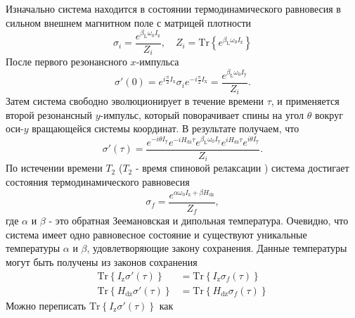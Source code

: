 \documentclass[utf8]{jetp}
\begin{document}
Изначально система находится в состоянии термодинамического равновесия в сильном внешнем магнитном поле с матрицей плотности
%
\begin{equation}
  \label{eq:a1}
  \sigma_{i} = \dfrac{e^{\beta_\mathrm{L} \omega_{0} I_\mathrm{z}}}{Z_{i}} ,
  \quad
  Z_{i} = \mathrm{Tr}\left\{e^{\beta_\mathrm{L} \omega_{0} I_\mathrm{z}} \right\}
\end{equation}
%
После первого резонансного $x$-импульса
%
\begin{equation}
  \label{eq:a2}
  \sigma'(0) = e^{ i \frac \pi 2 I_\mathrm{x}}
  \sigma_{i}
  e^{-i \frac \pi 2 I_\mathrm{x}}
  = \dfrac{e^{\beta_\mathrm{L} \omega_{0} I_\mathrm{y}}}{Z_{i}} .
\end{equation}
%
Затем система свободно эволюционирует в течение времени $\tau$,
и применяется второй резонансный $y$-импульс, который поворачивает спины на угол $\theta$ вокруг оси-$y$ вращающейся системы координат.
В результате получаем, что
\begin{equation}
  \label{eq:a3}
  \sigma'(\tau)
  = \dfrac{
   e^{-i \theta I_\mathrm{y}} e^{-i H_\mathrm{dz} \tau}
   e^{\beta_\mathrm{L} \omega_{0} I_\mathrm{y}}
   e^{i H_\mathrm{dz} \tau} e^{i \theta I_\mathrm{y}}
  }{Z_{i}}.
\end{equation}
%
По истечении времени $T_2$ ($T_2$ - время спиновой релаксации \cite{Goldman_1970}) система достигает состояния термодинамического равновесия
\begin{equation}
  \label{eq:a4}
  \sigma_{f}
  = \dfrac{ e^{\alpha \omega_{0} I_\mathrm{z} + \beta H_\mathrm{dz}} }{Z_f},
\end{equation}
%
где $\alpha$ и $\beta$ - это обратная Зеемановская и дипольная температура.
Очевидно, что система имеет одно равновесное состояние
и существуют уникальные температуры $\alpha$ и $\beta$,
удовлетворяющие закону сохранения.
Данные температуры могут быть получены из законов сохранения
\begin{align}
  \label{eq:a5}
  \mathrm{Tr} \left\{ I_\mathrm{z} \sigma'(\tau) \right\}
  & = \mathrm{Tr} \left\{ I_\mathrm{z} \sigma_{f}(\tau) \right\}
  \\
  \label{eq:a6}
  \mathrm{Tr} \left\{ H_\mathrm{dz} \sigma'(\tau) \right\}
  & = \mathrm{Tr} \left\{ H_\mathrm{dz} \sigma_{f}(\tau) \right\}
\end{align}
%
Можно переписать $\mathrm{Tr} \left\{ I_\mathrm{z} \sigma'(\tau) \right\}$ как
%
\end{document}
